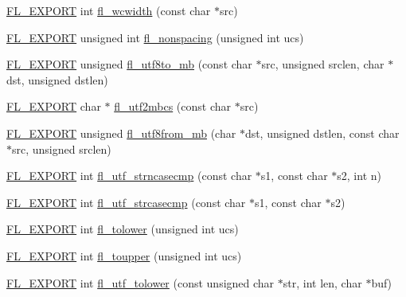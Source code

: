 \begin{DoxyCompactItemize}
\item 
\hyperlink{_fl___export_8_h_aa9ba29a18aee9d738370a06eeb4470fc}{F\+L\+\_\+\+E\+X\+P\+O\+RT} int \hyperlink{group__fl__unicode_ga702a820d16a76a28ef5c68b045f7ed19}{fl\+\_\+wcwidth} (const char $\ast$src)
\item 
\hyperlink{_fl___export_8_h_aa9ba29a18aee9d738370a06eeb4470fc}{F\+L\+\_\+\+E\+X\+P\+O\+RT} unsigned int \hyperlink{group__fl__unicode_ga0cc37feadfe6ae868b3818bca5f41125}{fl\+\_\+nonspacing} (unsigned int ucs)
\item 
\hyperlink{_fl___export_8_h_aa9ba29a18aee9d738370a06eeb4470fc}{F\+L\+\_\+\+E\+X\+P\+O\+RT} unsigned \hyperlink{group__fl__unicode_ga274a65a33060f9f881e5578afb1fa49c}{fl\+\_\+utf8to\+\_\+mb} (const char $\ast$src, unsigned srclen, char $\ast$dst, unsigned dstlen)
\item 
\hyperlink{_fl___export_8_h_aa9ba29a18aee9d738370a06eeb4470fc}{F\+L\+\_\+\+E\+X\+P\+O\+RT} char $\ast$ \hyperlink{group__fl__unicode_ga94cf67d0e907b38c65169dfea8090919}{fl\+\_\+utf2mbcs} (const char $\ast$src)
\item 
\hyperlink{_fl___export_8_h_aa9ba29a18aee9d738370a06eeb4470fc}{F\+L\+\_\+\+E\+X\+P\+O\+RT} unsigned \hyperlink{group__fl__unicode_gadf6c13aafd764bc6d9cd84a7d0837760}{fl\+\_\+utf8from\+\_\+mb} (char $\ast$dst, unsigned dstlen, const char $\ast$src, unsigned srclen)
\item 
\hyperlink{_fl___export_8_h_aa9ba29a18aee9d738370a06eeb4470fc}{F\+L\+\_\+\+E\+X\+P\+O\+RT} int \hyperlink{group__fl__unicode_ga5959b9951d42fae77fdc5bb2ffa92a89}{fl\+\_\+utf\+\_\+strncasecmp} (const char $\ast$s1, const char $\ast$s2, int n)
\item 
\hyperlink{_fl___export_8_h_aa9ba29a18aee9d738370a06eeb4470fc}{F\+L\+\_\+\+E\+X\+P\+O\+RT} int \hyperlink{group__fl__unicode_gae7965b3883a037a48a30080b2317bb03}{fl\+\_\+utf\+\_\+strcasecmp} (const char $\ast$s1, const char $\ast$s2)
\item 
\hyperlink{_fl___export_8_h_aa9ba29a18aee9d738370a06eeb4470fc}{F\+L\+\_\+\+E\+X\+P\+O\+RT} int \hyperlink{group__fl__unicode_gac9898942b0e2a93600cafa6cd83f6332}{fl\+\_\+tolower} (unsigned int ucs)
\item 
\hyperlink{_fl___export_8_h_aa9ba29a18aee9d738370a06eeb4470fc}{F\+L\+\_\+\+E\+X\+P\+O\+RT} int \hyperlink{group__fl__unicode_ga31dff7a5f4169445b0dfce8299d4ba68}{fl\+\_\+toupper} (unsigned int ucs)
\item 
\hyperlink{_fl___export_8_h_aa9ba29a18aee9d738370a06eeb4470fc}{F\+L\+\_\+\+E\+X\+P\+O\+RT} int \hyperlink{group__fl__unicode_gafa6c7c24e9c8c7982f31b495d60dbf09}{fl\+\_\+utf\+\_\+tolower} (const unsigned char $\ast$str, int len, char $\ast$buf)

\end{DoxyCompactItemize}
